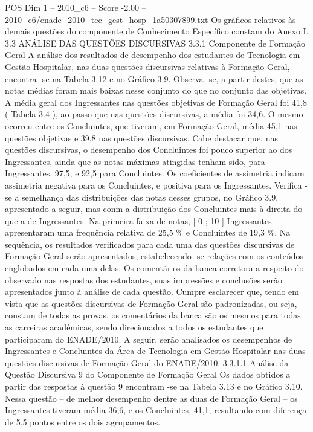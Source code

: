 \begin{textsample}{POS Dim 1 – 2010\_c6 – Score -2.00 – 2010\_c6/enade\_2010\_tec\_gest\_hosp\_1a50307899.txt}
Os gráficos relativos às demais questões do componente de Conhecimento Específico constam do Anexo I. 3.3 ANÁLISE DAS QUESTÕES DISCURSIVAS 3.3.1 Componente de Formação Geral A análise dos resultados de desempenho dos estudantes de Tecnologia em Gestão Hospitalar, nas duas questões discursivas relativas à Formação Geral, encontra -se na Tabela 3.12 e no Gráfico 3.9.
Observa -se, a partir destes, que as notas médias foram mais baixas nesse conjunto do que no conjunto das objetivas.
A média geral dos Ingressantes nas questões objetivas de Formação Geral foi 41,8 ( Tabela 3.4 ), ao passo que nas questões discursivas, a média foi 34,6.
O mesmo ocorreu entre os Concluintes, que tiveram, em Formação Geral, média 45,1 nas questões objetivas e 39,8 nas questões discursivas.
Cabe destacar que, nas questões discursivas, o desempenho dos Concluintes foi pouco superior ao dos Ingressantes, ainda que as notas máximas atingidas tenham sido, para Ingressantes, 97,5, e 92,5 para Concluintes.
Os coeficientes de assimetria indicam assimetria negativa para os Concluintes, e positiva para os Ingressantes.
Verifica -se a semelhança das distribuições das notas desses grupos, no Gráfico 3.9, apresentado a seguir, mas conm a distribuição dos Concluintes mais à direita do que a de Ingressantes.
Na primeira faixa de notas, [ 0 ; 10 ] Ingressantes apresentaram uma frequência relativa de 25,5 \% e Concluintes de 19,3 \%.
Na sequência, os resultados verificados para cada uma das questões discursivas de Formação Geral serão apresentados, estabelecendo -se relações com os conteúdos englobados em cada uma delas.
Os comentários da banca corretora a respeito do observado nas respostas dos estudantes, suas impressões e conclusões serão apresentados junto à análise de cada questão.
Cumpre esclarecer que, tendo em vista que as questões discursivas de Formação Geral são padronizadas, ou seja, constam de todas as provas, os comentários da banca são os mesmos para todas as carreiras acadêmicas, sendo direcionados a todos os estudantes que participaram do ENADE/2010.
A seguir, serão analisados os desempenhos de Ingressantes e Concluintes da Área de Tecnologia em Gestão Hospitalar nas duas questões discursivas de Formação Geral do ENADE/2010. 3.3.1.1 Análise da Questão Discursiva 9 do Componente de Formação Geral Os dados obtidos a partir das respostas à questão 9 encontram -se na Tabela 3.13 e no Gráfico 3.10.
Nessa questão – de melhor desempenho dentre as duas de Formação Geral – os Ingressantes tiveram média 36,6, e os Concluintes, 41,1, resultando com diferença de 5,5 pontos entre os dois agrupamentos.

\end{textsample}
